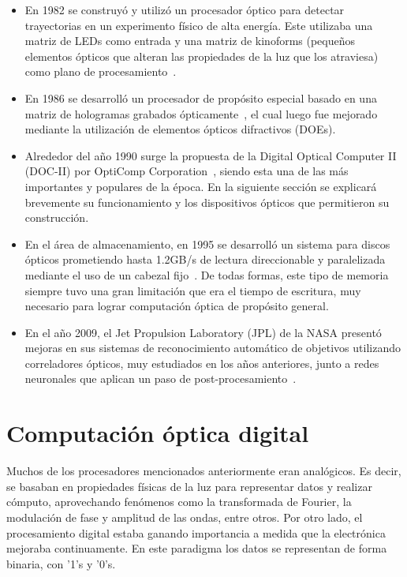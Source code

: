 \documentclass[12pt,a4paper]{report}
\begin{document}
\begin{itemize}
    \item En 1982 se construyó y utilizó un procesador óptico para detectar trayectorias en un experimento físico de alta energía. Este utilizaba una matriz de LEDs como entrada y una matriz de kinoforms (pequeños elementos ópticos que alteran las propiedades de la luz que los atraviesa) como plano de procesamiento~\cite{kinoforms}.
    \item En 1986 se desarrolló un procesador de propósito especial basado en una matriz de hologramas grabados ópticamente~\cite{ambsHoughTransform}, el cual luego fue mejorado mediante la utilización de elementos ópticos difractivos (DOEs).
    \item Alrededor del año 1990 surge la propuesta de la Digital Optical Computer II (DOC-II) por OptiComp Corporation~\cite{docII}, siendo esta una de las más importantes y populares de la época. En la siguiente sección se explicará brevemente su funcionamiento y los dispositivos ópticos que permitieron su construcción.
    \item En el área de almacenamiento, en 1995 se desarrolló un sistema para discos ópticos prometiendo hasta 1.2GB/s de lectura direccionable y paralelizada mediante el uso de un cabezal fijo~\cite{opticalmemory}. De todas formas, este tipo de memoria siempre tuvo una gran limitación que era el tiempo de escritura, muy necesario para lograr computación óptica de propósito general.
    \item En el año 2009, el Jet Propulsion Laboratory (JPL) de la NASA presentó mejoras en sus sistemas de reconocimiento automático de objetivos utilizando correladores ópticos, muy estudiados en los años anteriores, junto a redes neuronales que aplican un paso de post-procesamiento~\cite{JPLATR}.
\end{itemize}

\section{Computación óptica digital}

Muchos de los procesadores mencionados anteriormente eran analógicos. Es decir, se basaban en propiedades físicas de la luz para representar datos y realizar cómputo, aprovechando fenómenos como la transformada de Fourier, la modulación de fase y amplitud de las ondas, entre otros. Por otro lado, el procesamiento digital estaba ganando importancia a medida que la electrónica mejoraba continuamente. En este paradigma los datos se representan de forma binaria, con '1's y '0's.
\end{document}
